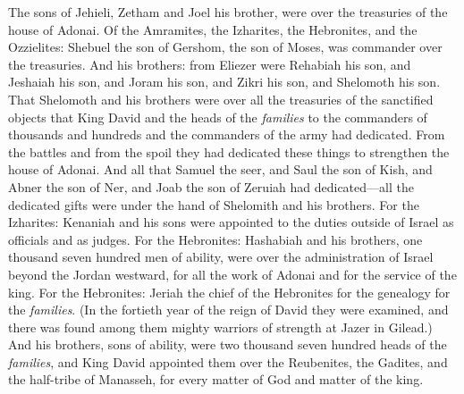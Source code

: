 \begin{biblechapter}
\verse The sons of Jehieli, Zetham and Joel his brother, were over the treasuries of the house of Adonai.
\verse Of the Amramites, the Izharites, the Hebronites, and the Ozzielites:
\verse Shebuel the son of Gershom, the son of Moses, was commander over the treasuries.
\verse And his brothers: from Eliezer were Rehabiah his son, and Jeshaiah his son, and Joram his son, and Zikri his son, and Shelomoth his son.
\verse That Shelomoth and his brothers were over all the treasuries of the sanctified objects that King David and the heads of the \textit{families} to the commanders of thousands and hundreds and the commanders of the army had dedicated.
\verse From the battles and from the spoil they had dedicated these things to strengthen the house of Adonai.
\verse And all that Samuel the seer, and Saul the son of Kish, and Abner the son of Ner, and Joab the son of Zeruiah had dedicated—all the dedicated gifts were under the hand of Shelomith and his brothers.
\verse For the Izharites: Kenaniah and his sons were appointed to the duties outside of Israel as officials and as judges.
\verse For the Hebronites: Hashabiah and his brothers, one thousand seven hundred men of ability, were over the administration of Israel beyond the Jordan westward, for all the work of Adonai and for the service of the king.
\verse For the Hebronites: Jeriah the chief of the Hebronites for the genealogy for the \textit{families}. (In the fortieth year of the reign of David they were examined, and there was found among them mighty warriors of strength at Jazer in Gilead.)
\verse And his brothers, sons of ability, were two thousand seven hundred heads of the \textit{families}, and King David appointed them over the Reubenites, the Gadites, and the half-tribe of Manasseh, for every matter of God and matter of the king.
\end{biblechapter}

